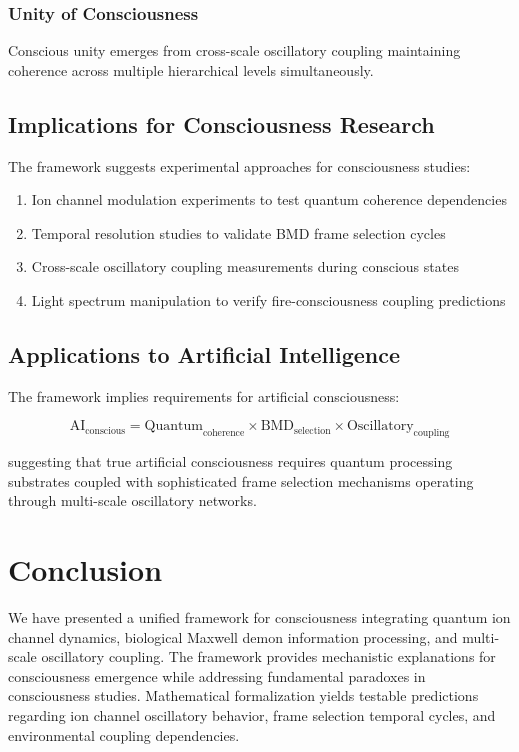 \documentclass[12pt,a4paper]{article}
\begin{document}
\subsubsection{Unity of Consciousness}
Conscious unity emerges from cross-scale oscillatory coupling maintaining coherence across multiple hierarchical levels simultaneously.

\subsection{Implications for Consciousness Research}

The framework suggests experimental approaches for consciousness studies:

\begin{enumerate}
\item Ion channel modulation experiments to test quantum coherence dependencies
\item Temporal resolution studies to validate BMD frame selection cycles  
\item Cross-scale oscillatory coupling measurements during conscious states
\item Light spectrum manipulation to verify fire-consciousness coupling predictions
\end{enumerate}

\subsection{Applications to Artificial Intelligence}

The framework implies requirements for artificial consciousness:

\begin{equation}
\text{AI}_{\text{conscious}} = \text{Quantum}_{\text{coherence}} \times \text{BMD}_{\text{selection}} \times \text{Oscillatory}_{\text{coupling}}
\end{equation}

suggesting that true artificial consciousness requires quantum processing substrates coupled with sophisticated frame selection mechanisms operating through multi-scale oscillatory networks.

\section{Conclusion}

We have presented a unified framework for consciousness integrating quantum ion channel dynamics, biological Maxwell demon information processing, and multi-scale oscillatory coupling. The framework provides mechanistic explanations for consciousness emergence while addressing fundamental paradoxes in consciousness studies. Mathematical formalization yields testable predictions regarding ion channel oscillatory behavior, frame selection temporal cycles, and environmental coupling dependencies.
\end{document}

